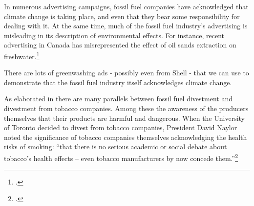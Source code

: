 In numerous advertising campaigns, fossil fuel companies have acknowledged that climate change is taking place, and even that they bear some responsibility for dealing with it.
At the same time, much of the fossil fuel industry's advertising is misleading in its description of environmental effects.
For instance, recent advertising in Canada has misrepresented the effect of oil sands extraction on freshwater.\footcite[][]{PembinaOilAds}


\begin{vcom}
There are lots of greenwashing ads - possibly even from Shell - that we can use to demonstrate that the fossil fuel industry itself acknowledges climate change.
\end{vcom}



As elaborated in  there are many parallels between fossil fuel divestment and divestment from tobacco companies.
Among these the awareness of the producers themselves that their products are harmful and dangerous.
When the University of Toronto decided to divest from tobacco companies, President David Naylor noted the significance of tobacco companies themselves acknowledging the health risks of smoking: ``that there is no serious academic or social debate about tobacco's health effects – even tobacco manufacturers by now concede them.''\footcite[][]{TStarSellOff}



